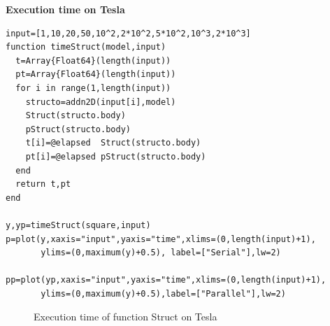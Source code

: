 \documentclass[a4paper,12pt]{article}
\begin{document}
\noindent\textbf{Execution time on Tesla}
\begin{Verbatim}[fontsize=\footnotesize]
input=[1,10,20,50,10^2,2*10^2,5*10^2,10^3,2*10^3]
function timeStruct(model,input)
  t=Array{Float64}(length(input))
  pt=Array{Float64}(length(input))
  for i in range(1,length(input))
    structo=addn2D(input[i],model)
    Struct(structo.body)
    pStruct(structo.body)
    t[i]=@elapsed  Struct(structo.body)
    pt[i]=@elapsed pStruct(structo.body)
  end
  return t,pt
end

y,yp=timeStruct(square,input)
p=plot(y,xaxis="input",yaxis="time",xlims=(0,length(input)+1),
       ylims=(0,maximum(y)+0.5), label=["Serial"],lw=2)
       
pp=plot(yp,xaxis="input",yaxis="time",xlims=(0,length(input)+1),
       ylims=(0,maximum(y)+0.5),label=["Parallel"],lw=2)
\end{Verbatim}
\begin{figure}[!h]
\centering
{}
\caption{Execution time of function Struct on Tesla}
\end{figure}
\newpage
\end{document}
